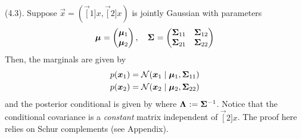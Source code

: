 \documentclass[11pt]{article}
\begin{document}
\myspace
\p {} (4.3). Suppose $\vec x = (\vec[1]{x}, \vec[2]{x})$ is jointly Gaussian with parameters
\begin{align}
	\vec{\mu}
		= \begin{pmatrix}
				\vec[1]{\mu} \\
				\vec[2]{\mu}
			\end{pmatrix},
	\quad
	\matr\Sigma
		= \begin{pmatrix}
			\matr[11]{\Sigma} & \matr[12]{\Sigma} \\
			\matr[21]{\Sigma} & \matr[22]{\Sigma}		
			\end{pmatrix}
\end{align}
Then, the marginals are given by
\begin{align}
	p(\vec[1]{x}) 
		&= \mathcal{N}(\vec[1]{x} \mid \vec[1]{\mu}, \matr[11]{\Sigma}) \\
	p(\vec[2]{x}) 
		&= \mathcal{N}(\vec[2]{x} \mid \vec[2]{\mu}, \matr[22]{\Sigma})
\end{align}
and the posterior conditional is given by
where $\matr{\Lambda} := \minv{\Sigma}$. Notice that the conditional covariance is a \textit{constant} matrix independent of $\vec[2]{x}$. The proof here relies on Schur complements (see Appendix). 
\end{document}
